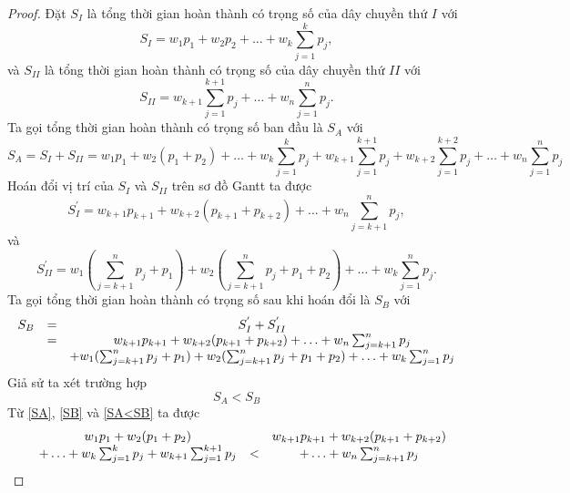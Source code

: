 \begin{proof}
	Đặt $S_I$ là tổng thời gian hoàn thành có trọng số của dây chuyền thứ $I$ với
	\begin{equation}
		S_I = w_1 p_1 + w_2 p_2 + \ldots + w_k \sum_{j=1}^k p_j,
	\end{equation}
	và $S_{II}$ là tổng thời gian hoàn thành có trọng số của dây chuyền thứ $II$ với
	\begin{equation}
		S_{II} = w_{k+1} \sum_{j=1}^{k+1} p_j + \ldots + w_n \sum_{j=1}^{n} p_j.
	\end{equation}
	Ta gọi tổng thời gian hoàn thành có trọng số ban đầu là $S_A$ với
	\begin{equation} \label{SA}
		S_A = S_I + S_{II} = w_1 p_1 + w_2 (p_1 + p_2) + \ldots + w_k \sum_{j=1}^k p_j + w_{k+1} \sum_{j=1}^{k+1} p_j + w_{k+2} \sum_{j=1}^{k+2} p_j + \ldots + w_n \sum_{j=1}^{n} p_j
	\end{equation}
	Hoán đổi vị trí của $S_I$ và $S_{II}$ trên sơ đồ Gantt ta được
	\begin{equation}
		S_I^{'} = w_{k+1} p_{k+1} + w_{k+2}(p_{k+1} + p_{k+2}) + \ldots + w_n \sum_{j=k+1}^{n} p_j,
	\end{equation}
	và
	\begin{equation}
		S_{II}^{'} = w_1(\sum_{j=k+1}^{n}p_j+p_1) + w_2(\sum_{j=k+1}^{n}p_j+p_1+p_2) + \ldots + w_k\sum_{j=1}^{n} p_j.
	\end{equation}
	Ta gọi tổng thời gian hoàn thành có trọng số sau khi hoán đổi là $S_B$ với
	\begin{equation} \label{SB}
		\begin{array}{c c c}
		S_B &=& S_I^{'} + S_{II}^{'} \\
		&=& w_{k+1} p_{k+1} + w_{k+2}(p_{k+1} + p_{k+2}) + \ldots + w_n \sum_{j=k+1}^{n} p_j \\
		&& + w_1(\sum_{j=k+1}^{n}p_j+p_1) + w_2(\sum_{j=k+1}^{n}p_j+p_1+p_2) + \ldots + w_k\sum_{j=1}^{n} p_j
		\end{array}
	\end{equation}
	Giả sử ta xét trường hợp
	\begin{equation} \label{SA<SB}
		S_A < S_B
	\end{equation}
	Từ \eqref{SA}, \eqref{SB} và \eqref{SA<SB} ta được
	\begin{equation*}
	\begin{array}{c c c c}
	& w_1 p_1 + w_2 (p_1 + p_2)  && w_{k+1} p_{k+1} + w_{k+2}(p_{k+1} + p_{k+2}) \\

	& + \ldots + w_k \sum_{j=1}^k p_j + w_{k+1} \sum_{j=1}^{k+1} p_j &<& + \ldots + w_n \sum_{j=k+1}^{n} p_j \\
	

\end{array}
\end{equation*}
\end{proof}
